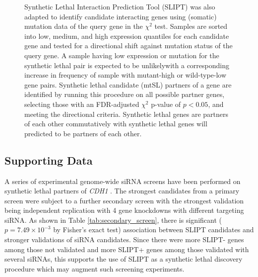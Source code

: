 \begin{figure}[!ht]
  \begin{center}
  \resizebox{0.8 \textwidth}{!}{
    
   }
   \end{center}
   \caption[Synthetic lethal prediction adapted for mutation]{\textbf{} Synthetic Lethal Interaction Prediction Tool (SLIPT) was also adapted to identify candidate interacting genes using (somatic) mutation data of the query gene in the $\chi^2$ test. Samples are sorted into low, medium, and high expression quantiles for each candidate gene and tested for a directional shift against mutation status of the query gene. A sample having low expression or mutation for the synthetic lethal pair is expected to be unlikelywith a corresponding increase in frequency of sample with mutant-high or wild-type-low gene pairs. Synthetic lethal candidate (mtSL) partners of a gene are identified by running this procedure on all possible partner genes, selecting those with an FDR-adjusted $\chi^2$ p-value of $p < 0.05$, and meeting the directional criteria. Synthetic lethal genes are partners of each other commutatively with synthetic lethal genes will predicted to be partners of each other.
}
\label{fig:SLIPT_Method_mtSL}
\end{figure}

\subsection{Supporting Data}

A series of experimental genome-wide siRNA screens have been performed on synthetic lethal partners of \textit{CDH1} \cite{Telford2015}. The strongest candidates from a primary screen were subject to a further secondary screen with the strongest validation being independent replication with 4 gene knockdowns with different targeting siRNA. As shown in Table \ref{tab:secondary_screen}, there is significant ($p=7.49 \times 10^{-3}$ by Fisher's exact test) %
association between SLIPT candidates and stronger validations of siRNA candidates. Since there were more SLIPT- genes among those not validated and more SLIPT+ genes among those validated with several siRNAs, this supports the use of SLIPT as a synthetic lethal discovery procedure which may augment such screening experiments.


